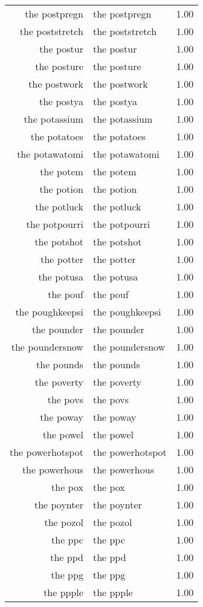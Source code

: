 \begin{table}[ht]
\begin{tabular}{rlr}
  the postpregn & the postpregn & 1.00 \\ 
  the poststretch & the poststretch & 1.00 \\ 
  the postur & the postur & 1.00 \\ 
  the posture & the posture & 1.00 \\ 
  the postwork & the postwork & 1.00 \\ 
  the postya & the postya & 1.00 \\ 
  the potassium & the potassium & 1.00 \\ 
  the potatoes & the potatoes & 1.00 \\ 
  the potawatomi & the potawatomi & 1.00 \\ 
  the potem & the potem & 1.00 \\ 
  the potion & the potion & 1.00 \\ 
  the potluck & the potluck & 1.00 \\ 
  the potpourri & the potpourri & 1.00 \\ 
  the potshot & the potshot & 1.00 \\ 
  the potter & the potter & 1.00 \\ 
  the potusa & the potusa & 1.00 \\ 
  the pouf & the pouf & 1.00 \\ 
  the poughkeepsi & the poughkeepsi & 1.00 \\ 
  the pounder & the pounder & 1.00 \\ 
  the poundersnow & the poundersnow & 1.00 \\ 
  the pounds & the pounds & 1.00 \\ 
  the poverty & the poverty & 1.00 \\ 
  the povs & the povs & 1.00 \\ 
  the poway & the poway & 1.00 \\ 
  the powel & the powel & 1.00 \\ 
  the powerhotspot & the powerhotspot & 1.00 \\ 
  the powerhous & the powerhous & 1.00 \\ 
  the pox & the pox & 1.00 \\ 
  the poynter & the poynter & 1.00 \\ 
  the pozol & the pozol & 1.00 \\ 
  the ppc & the ppc & 1.00 \\ 
  the ppd & the ppd & 1.00 \\ 
  the ppg & the ppg & 1.00 \\ 
  the ppple & the ppple & 1.00 \\ 

\end{tabular}
\end{table}
